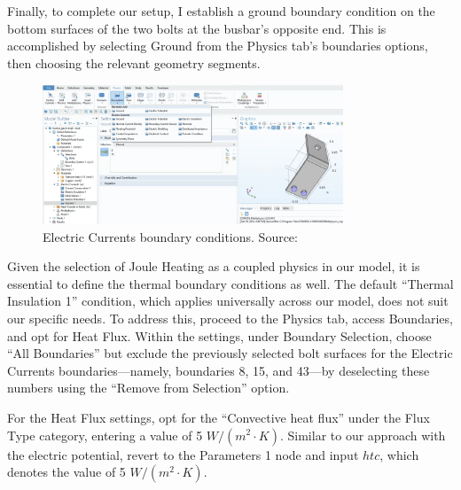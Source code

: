 Finally, to complete our setup, I establish a ground boundary condition on the bottom surfaces of the two bolts at the busbar's opposite end. This is accomplished by selecting Ground from the Physics tab's boundaries options, then choosing the relevant geometry segments.

\begin{figure}[H]
  \centering
  \includegraphics[width=0.8\textwidth]{Chapters/Figures/Chapter 3 Figures/Electric Currents Boundary Conditions.png}
  \caption{Electric Currents boundary conditions. Source: \cite{multiphysics__modeling_nodate}}
  \label{fig:Electric Currents boundary conditions}
\end{figure}

Given the selection of Joule Heating as a coupled physics in our model, it is essential to define the thermal boundary conditions as well. The default ``Thermal Insulation 1'' condition, which applies universally across our model, does not suit our specific needs. To address this, proceed to the Physics tab, access Boundaries, and opt for Heat Flux. Within the settings, under Boundary Selection, choose ``All Boundaries'' but exclude the previously selected bolt surfaces for the Electric Currents boundaries—namely, boundaries 8, 15, and 43—by deselecting these numbers using the ``Remove from Selection'' option.

For the Heat Flux settings, opt for the ``Convective heat flux'' under the Flux Type category, entering a value of 5 $W/(m^2\cdot K)$. Similar to our approach with the electric potential, revert to the Parameters 1 node and input $htc$, which denotes the value of 5 $W/(m^2\cdot K)$.


